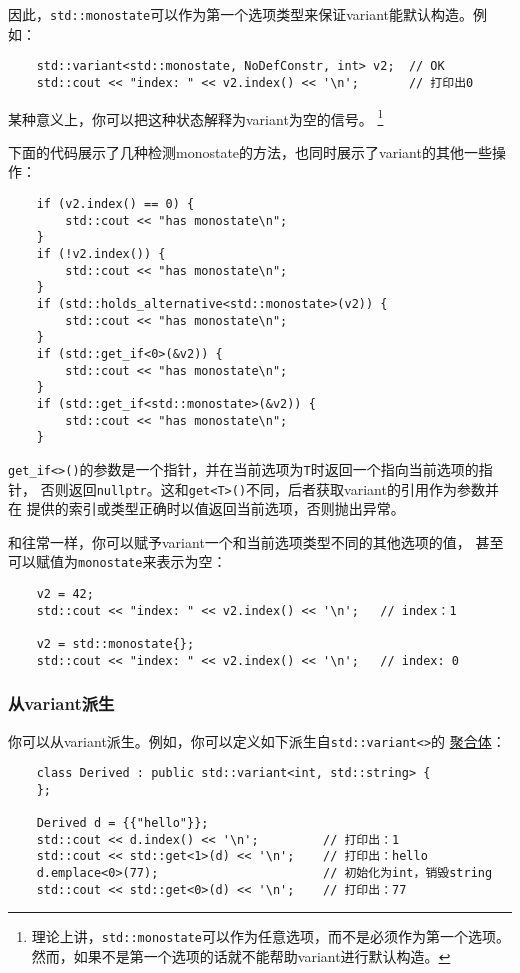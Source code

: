 因此，\texttt{std::monostate}可以作为第一个选项类型来保证variant能默认构造。例如：
\begin{lstlisting}
    std::variant<std::monostate, NoDefConstr, int> v2;  // OK
    std::cout << "index: " << v2.index() << '\n';       // 打印出0
\end{lstlisting}
某种意义上，你可以把这种状态解释为variant为空的信号。
\footnote{理论上讲，\texttt{std::monostate}可以作为任意选项，而不是必须作为第一个选项。
然而，如果不是第一个选项的话就不能帮助variant进行默认构造。}

下面的代码展示了几种检测monostate的方法，也同时展示了variant的其他一些操作：
\begin{lstlisting}
    if (v2.index() == 0) {
        std::cout << "has monostate\n";
    }
    if (!v2.index()) {
        std::cout << "has monostate\n";
    }
    if (std::holds_alternative<std::monostate>(v2)) {
        std::cout << "has monostate\n";
    }
    if (std::get_if<0>(&v2)) {
        std::cout << "has monostate\n";
    }
    if (std::get_if<std::monostate>(&v2)) {
        std::cout << "has monostate\n";
    }
\end{lstlisting}
\texttt{get\_if<>()}的参数是一个指针，并在当前选项为\texttt{T}时返回一个指向当前选项的指针，
否则返回\texttt{nullptr}。这和\texttt{get<T>()}不同，后者获取variant的引用作为参数并在
提供的索引或类型正确时以值返回当前选项，否则抛出异常。

和往常一样，你可以赋予variant一个和当前选项类型不同的其他选项的值，
甚至可以赋值为\texttt{monostate}来表示为空：
\begin{lstlisting}
    v2 = 42;
    std::cout << "index: " << v2.index() << '\n';   // index：1

    v2 = std::monostate{};
    std::cout << "index: " << v2.index() << '\n';   // index: 0
\end{lstlisting}

\subsubsection{从variant派生}
你可以从variant派生。例如，你可以定义如下派生自\texttt{std::variant<>}的
\hyperref[ch4]{聚合体}：
\begin{lstlisting}
    class Derived : public std::variant<int, std::string> {
    };

    Derived d = {{"hello"}};
    std::cout << d.index() << '\n';         // 打印出：1
    std::cout << std::get<1>(d) << '\n';    // 打印出：hello
    d.emplace<0>(77);                       // 初始化为int，销毁string
    std::cout << std::get<0>(d) << '\n';    // 打印出：77
\end{lstlisting}


